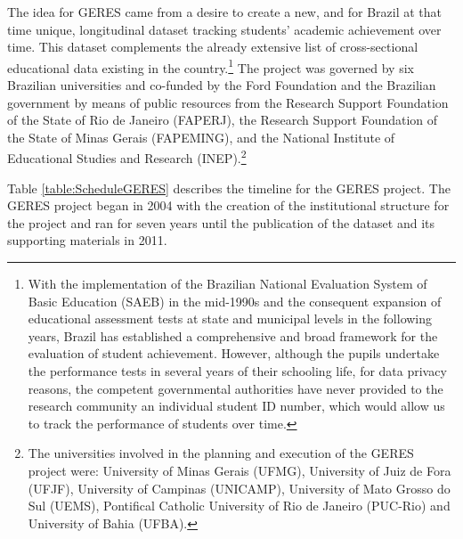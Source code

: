 \documentclass[a4paper, 12pt]{article}
\begin{document}
The idea for GERES came from a desire to create a new, and for Brazil at that time unique, longitudinal dataset tracking students’ academic achievement over time. This dataset complements the already extensive list of cross-sectional educational data existing in the country.\footnote{With the implementation of the Brazilian National Evaluation System of Basic Education (SAEB) in the mid-1990s and the consequent expansion of educational assessment tests at state and municipal levels in the following years, Brazil has established a comprehensive and broad framework for the evaluation of student achievement. However, although the pupils undertake the performance tests in several years of their schooling life, for data privacy reasons, the competent governmental authorities have never provided to the research community an individual student ID number, which would allow us to track the performance of students over time.} The project was governed by six Brazilian universities and co-funded by the Ford Foundation and the Brazilian government by means of public resources from the Research Support Foundation of the State of Rio de Janeiro (FAPERJ), the Research Support Foundation of the State of Minas Gerais (FAPEMING), and the National Institute of Educational Studies and Research (INEP).\footnote{The universities involved in the planning and execution of the GERES project were: University of Minas Gerais (UFMG), University of Juiz de Fora (UFJF), University of Campinas (UNICAMP), University of Mato Grosso do Sul (UEMS), Pontifical Catholic University of Rio de Janeiro (PUC-Rio) and University of Bahia (UFBA).} 

Table \ref{table:ScheduleGERES} describes the timeline for the GERES project. The GERES project began in 2004 with the creation of the institutional structure for the project and ran for seven years until the publication of the dataset and its supporting materials in 2011.



\end{document}

